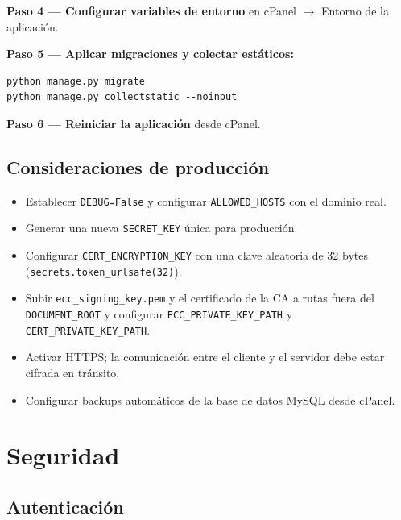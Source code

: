 \documentclass[10pt,letterpaper]{report}
\begin{document}
\textbf{Paso 4 — Configurar variables de entorno} en cPanel $\to$ Entorno de la aplicación.

\textbf{Paso 5 — Aplicar migraciones y colectar estáticos:}
\begin{lstlisting}
python manage.py migrate
python manage.py collectstatic --noinput
\end{lstlisting}

\textbf{Paso 6 — Reiniciar la aplicación} desde cPanel.

\section{Consideraciones de producción}

\begin{itemize}[leftmargin=*]
    \item Establecer \texttt{DEBUG=False} y configurar \texttt{ALLOWED\_HOSTS} con el dominio real.
    \item Generar una nueva \texttt{SECRET\_KEY} única para producción.
    \item Configurar \texttt{CERT\_ENCRYPTION\_KEY} con una clave aleatoria de 32 bytes (\texttt{secrets.token\_urlsafe(32)}).
    \item Subir \texttt{ecc\_signing\_key.pem} y el certificado de la CA a rutas fuera del \texttt{DOCUMENT\_ROOT} y configurar \texttt{ECC\_PRIVATE\_KEY\_PATH} y \texttt{CERT\_PRIVATE\_KEY\_PATH}.
    \item Activar HTTPS; la comunicación entre el cliente y el servidor debe estar cifrada en tránsito.
    \item Configurar backups automáticos de la base de datos MySQL desde cPanel.
\end{itemize}

\chapter{Seguridad}

\section{Autenticación}
\end{document}
